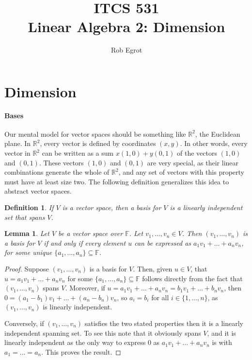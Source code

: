 \documentclass{article}
\title{ITCS 531 \\Linear Algebra 2: Dimension}
\author{Rob Egrot}
\date{}
\theoremstyle{plain}
\newtheorem{definition}[theorem]{Definition}{\bfseries}{\upshape}
\newtheorem{lemma}[theorem]{Lemma}{\bfseries}{\upshape}
\newcommand{\bR}{\mathbb{R}}
\newcommand{\bF}{\mathbb{F}}
\begin{document}
\maketitle
\section{Dimension}
\paragraph{Bases}
Our mental model for vector spaces should be something like $\bR^2$, the Euclidean plane. In $\bR^2$, every vector is defined by coordinates $(x,y)$. In other words, every vector in $\bR^2$ can be written as a sum $x(1,0)+y(0,1)$ of the vectors $(1,0)$ and $(0,1)$. These vectors $(1,0)$ and $(0,1)$ are very special, as their linear combinations generate the whole of $\bR^2$, and any set of vectors with this property must have at least size two. The following definition generalizes this idea to abstract vector spaces.

\begin{definition}
If $V$ is a vector space, then a \emph{basis} for $V$ is a linearly independent set that spans $V$.
\end{definition}

\begin{lemma}
Let $V$ be a vector space over $\bF$. Let $v_1,\ldots,v_n\in V$. Then $(v_1,\ldots,v_n)$ is a basis for $V$ if and only if every element $u$ can be expressed as $a_1v_1+\ldots + a_nv_n$, for some unique $\{a_1,\ldots,a_n\}\subseteq \bF$. 
\end{lemma}
\begin{proof}
Suppose $(v_1,\ldots,v_n)$ is a basis for $V$. Then, given $u\in V$, that $u= a_1v_1+\ldots + a_nv_n$ for some $\{a_1,\ldots,a_n\}\subseteq \bF$ follows directly from the fact that $(v_1,\ldots,v_n)$ spans $V$. Moreover, if $u = a_1v_1+\ldots + a_nv_n = b_1v_1+\ldots + b_nv_n$, then $0 = (a_1-b_1)v_1+\ldots +(a_n-b_n)v_n$, so $a_i=b_i$ for all $i\in \{1,\ldots,n\}$, as $(v_1,\ldots,v_n)$ is linearly independent.

Conversely, if $(v_1,\ldots,v_n)$ satisfies the two stated properties then it is a linearly independent spanning set. To see this note that it obviously spans $V$, and it is linearly independent as the only way to express $0$ as $a_1v_1+\ldots+ a_nv_n$ is with $a_1=\ldots=a_n$. This proves the result.  
\end{proof}
\end{document}
